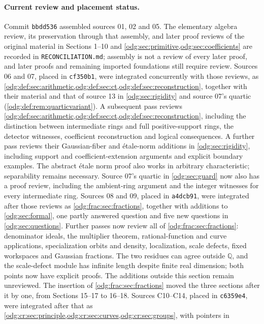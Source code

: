\documentclass[11pt,oneside]{article}
\numberwithin{equation}{section}
\theoremstyle{definition}
\theoremstyle{remark}
\newcommand{\Q}{\mathbb Q}
\newcommand{\fn}[1]{\nolinkurl{#1}}
\begin{document}
\paragraph{Current review and placement status.}
Commit \texttt{bbdd536} assembled sources 01, 02 and 05. The elementary
algebra review, its preservation through that assembly, and later proof
reviews of the original material in Sections 1--10 and
\cref{odg:sec:primitive,odg:sec:coefficients} are recorded in \fn{RECONCILIATION.md};
assembly is not a review of every later proof, and later proofs and remaining
imported foundations still require review. Sources 06 and 07, placed in
\texttt{cf350b1}, were integrated concurrently with those reviews, as
\cref{odg:def:sec:arithmetic,odg:def:sec:ct,odg:def:sec:reconstruction},
together with their material and that of source 13 in
\cref{odg:sec:rigidity} and source 07's quartic
(\cref{odg:def:rem:quarticvariant}). A subsequent pass reviews
\cref{odg:def:sec:arithmetic,odg:def:sec:ct,odg:def:sec:reconstruction}, including
the distinction between intermediate rings and full positive-support rings,
the detector witnesses, coefficient reconstruction and logical consequences.
A further pass reviews their Gaussian-fiber and \'etale-norm additions
in \cref{odg:sec:rigidity}, including support and coefficient-extension
arguments and explicit boundary examples. The abstract \'etale norm proof
also works in arbitrary characteristic; separability remains necessary.
Source 07's quartic in \cref{odg:sec:guard} now also has a proof review,
including the ambient-ring argument and the integer witnesses for every
intermediate ring.
Sources 08 and 09, placed in \texttt{a4dcb91}, were integrated after those
reviews as \cref{odg:frac:sec:fractions}, together with additions to
\cref{odg:sec:formal}, one partly answered question and five new questions in
\cref{odg:sec:questions}. Further passes now review all of
\cref{odg:frac:sec:fractions}: denominator ideals, the multiplier theorem,
rational-function and curve applications, specialization orbits and density,
localization, scale defects, fixed workspaces and Gaussian fractions.
The two residues can agree outside $\Q$, and the scale-defect module has
infinite length despite finite real dimension; both points now have explicit
proofs. The additions outside this section remain unreviewed.
The insertion of \cref{odg:frac:sec:fractions} moved the three sections after it
by one, from Sections 15--17 to 16--18. Sources C10--C14, placed in
\texttt{c6359e4}, were integrated after that as
\cref{odg:cr:sec:principle,odg:cr:sec:curves,odg:cr:sec:groups}, with pointers in
\end{document}
